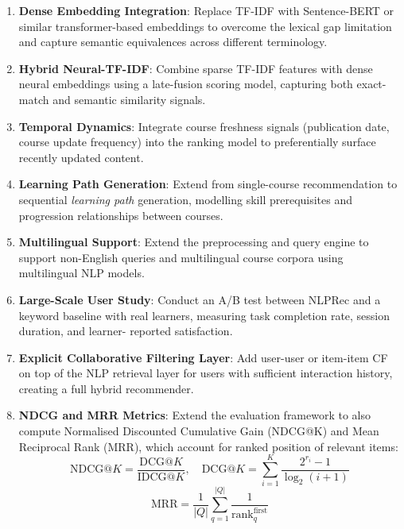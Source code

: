 \documentclass[12pt, a4paper]{article}
\begin{document}
\begin{enumerate}[leftmargin=*, label=\textbf{F\arabic*.}]
    \item \textbf{Dense Embedding Integration}: Replace TF-IDF with Sentence-BERT
    \cite{reimers2019sentence} or similar transformer-based embeddings to overcome the lexical
    gap limitation and capture semantic equivalences across different terminology.
    
    \item \textbf{Hybrid Neural-TF-IDF}: Combine sparse TF-IDF features with dense neural
    embeddings using a late-fusion scoring model, capturing both exact-match and semantic
    similarity signals.
    
    \item \textbf{Temporal Dynamics}: Integrate course freshness signals (publication date,
    course update frequency) into the ranking model to preferentially surface recently updated
    content.
    
    \item \textbf{Learning Path Generation}: Extend from single-course recommendation to
    sequential \textit{learning path} generation, modelling skill prerequisites and progression
    relationships between courses.
    
    \item \textbf{Multilingual Support}: Extend the preprocessing and query engine to support
    non-English queries and multilingual course corpora using multilingual NLP models.
    
    \item \textbf{Large-Scale User Study}: Conduct an A/B test between NLPRec and a keyword
    baseline with real learners, measuring task completion rate, session duration, and learner-
    reported satisfaction.
    
    \item \textbf{Explicit Collaborative Filtering Layer}: Add user-user or item-item CF on top
    of the NLP retrieval layer for users with sufficient interaction history, creating a full
    hybrid recommender.
    
    \item \textbf{NDCG and MRR Metrics}: Extend the evaluation framework to also compute
    Normalised Discounted Cumulative Gain (NDCG@K) and Mean Reciprocal Rank (MRR), which
    account for ranked position of relevant items:
    \begin{equation}
        \text{NDCG@}K = \frac{\text{DCG@}K}{\text{IDCG@}K}, \quad
        \text{DCG@}K = \sum_{i=1}^{K} \frac{2^{r_i} - 1}{\log_2(i+1)}
        \label{eq:ndcg}
    \end{equation}
    \begin{equation}
        \text{MRR} = \frac{1}{|Q|} \sum_{q=1}^{|Q|} \frac{1}{\text{rank}_q^{\text{first}}}
        \label{eq:mrr}
    \end{equation}
\end{enumerate}
\end{document}
